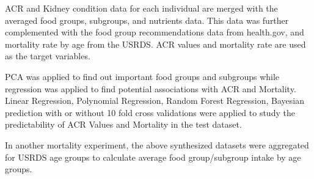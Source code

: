 \noindent ACR and Kidney condition data for each individual are merged with the averaged food groups, subgroups, and nutrients data. This data was further complemented with the food group recommendations data from health.gov, and mortality rate by age from the USRDS. ACR values and mortality rate  are used as the target variables.

\noindent PCA was applied to find out important food groups and subgroups while regression was applied to find potential associations with ACR and Mortality. Linear Regression, Polynomial Regression, Random Forest Regression, Bayesian prediction with or without 10 fold cross validations were applied to study the predictability of ACR Values and Mortality in the test dataset. 

\noindent In another mortality experiment, the above synthesized datasets were aggregated for USRDS age  groups to calculate average food group/subgroup intake by age groups. 